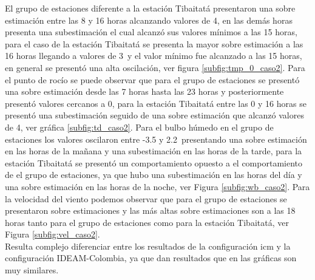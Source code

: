 El grupo de estaciones diferente a la estación Tibaitatá presentaron una sobre estimación entre las 8 y 16 horas alcanzando valores de 4\celc, en las demás horas presenta una subestimación el cual alcanzó sus valores mínimos a las 15 horas, para el caso de la estación Tibaitatá se presenta la mayor sobre estimación a las 16 horas llegando a valores de 3\celc\ y el valor mínimo fue alcanzado a las 15 horas, en general se presentó una alta oscilación, ver figura \ref{subfig:tmp_0_caso2}. Para el punto de rocío se puede observar que para el grupo de estaciones se presentó una sobre estimación desde las 7 horas hasta las 23 horas y posteriormente presentó valores cercanos a 0\celc, para la estación Tibaitatá entre las 0 y 16 horas se presentó una subestimación seguido de una sobre estimación que alcanzó valores de 4\celc, ver gráfica \ref{subfig:td_caso2}. Para el bulbo húmedo en el grupo de estaciones los valores oscilaron entre -3.5 y 2.2\celc\ presentando una sobre estimación en las horas de la mañana y una subestimación en las horas de la tarde, para la estación Tibaitatá se presentó un comportamiento opuesto a el comportamiento de el grupo de estaciones, ya que hubo una subestimación en las horas del día y una sobre estimación en las horas de la noche, ver Figura \ref{subfig:wb_caso2}. Para la velocidad del viento podemos observar que para el grupo de estaciones se presentaron sobre estimaciones y las más altas sobre estimaciones son a las 18 horas tanto para el grupo de estaciones como para la estación Tibaitatá, ver Figura \ref{subfig:vel_caso2}.\\

Resulta complejo diferenciar entre los resultados de la configuración icm y la configuración IDEAM-Colombia, ya que dan resultados que en las gráficas son muy similares.\\


